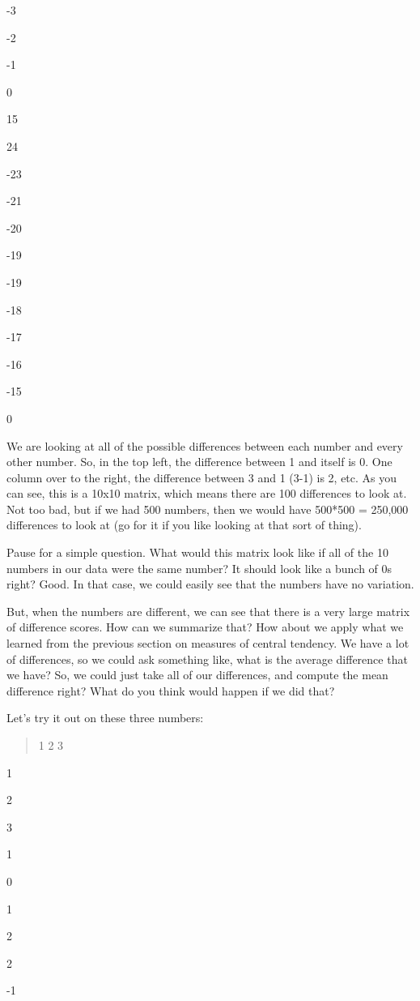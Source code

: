 \documentclass[
]{book}
\begin{document}
-3

-2

-1

0

15

24

-23

-21

-20

-19

-19

-18

-17

-16

-15

0

We are looking at all of the possible differences between each number and every other number. So, in the top left, the difference between 1 and itself is 0. One column over to the right, the difference between 3 and 1 (3-1) is 2, etc. As you can see, this is a 10x10 matrix, which means there are 100 differences to look at. Not too bad, but if we had 500 numbers, then we would have 500*500 = 250,000 differences to look at (go for it if you like looking at that sort of thing).

Pause for a simple question. What would this matrix look like if all of the 10 numbers in our data were the same number? It should look like a bunch of 0s right? Good. In that case, we could easily see that the numbers have no variation.

But, when the numbers are different, we can see that there is a very large matrix of difference scores. How can we summarize that? How about we apply what we learned from the previous section on measures of central tendency. We have a lot of differences, so we could ask something like, what is the average difference that we have? So, we could just take all of our differences, and compute the mean difference right? What do you think would happen if we did that?

Let's try it out on these three numbers:

\begin{quote}
1 2 3
\end{quote}

1

2

3

1

0

1

2

2

-1
\end{document}

